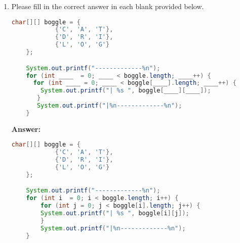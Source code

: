 \documentclass[12pt]{article}
\begin{document}
\begin{enumerate}[1.]
    \item

    Please fill in the correct answer in each blank provided below.


    \begin{lstlisting}[language=Java]
    char[][] boggle = {
            {'C', 'A', 'T'},
            {'D', 'R', 'I'},
            {'L', 'O', 'G'}
    };

    System.out.printf("-------------%n");
    for (int ____  = 0; ____ < boggle.length; ____++) {
      for (int ____ = 0; ____ < boggle[____].length; ____++) {
        System.out.printf("| %s ", boggle[____][____]);
       }
       System.out.printf("|%n-------------%n");
    }
    \end{lstlisting}

    \bigskip

    \textbf{Answer:}

    \begin{lstlisting}[language=Java]
    char[][] boggle = {
            {'C', 'A', 'T'},
            {'D', 'R', 'I'},
            {'L', 'O', 'G'}
    };

    System.out.printf("-------------%n");
    for (int i  = 0; i < boggle.length; i++) {
        for (int j = 0; j < boggle[i].length; j++) {
        System.out.printf("| %s ", boggle[i][j]);
        }
        System.out.printf("|%n-------------%n");
    }
    \end{lstlisting}
\end{enumerate}
\end{document}
